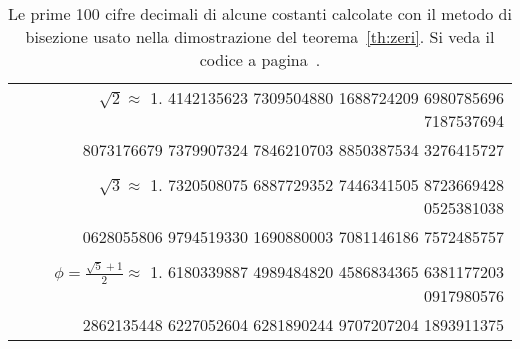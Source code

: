 \begin{table}
\begin{center}
\begin{tabular}{r}
$\sqrt 2 \approx $ 1.\small
4142135623 7309504880 1688724209 6980785696 7187537694 \\ \small
8073176679 7379907324 7846210703 8850387534 3276415727 \\
\\
$\sqrt 3 \approx$ 1.\small
7320508075 6887729352 7446341505 8723669428 0525381038 \\ \small
0628055806 9794519330 1690880003 7081146186 7572485757 \\
\\
$\phi = \frac{\sqrt 5+1}{2} \approx $ 1.\small
6180339887 4989484820 4586834365 6381177203 0917980576 \\ \small
2862135448 6227052604 6281890244 9707207204 1893911375
  \end{tabular}
\end{center}
\caption{Le prime 100 cifre decimali di alcune
costanti calcolate con il metodo di bisezione usato nella dimostrazione
del teorema~\ref{th:zeri}.
Si veda il codice a pagina~\pageref{code:bisection}.}
\label{fig:cifre_sqrt2}
\end{table}

